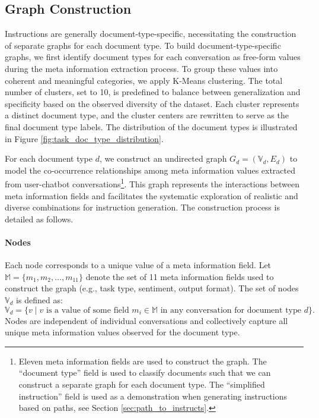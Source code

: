 \subsection{Graph Construction}
Instructions are generally document-type-specific, necessitating the construction of separate graphs for each document type. 
To build document-type-specific graphs, we first identify document types for each conversation as free-form values during the meta information extraction process. 
To group these values into coherent and meaningful categories, we apply K-Means clustering. The total number of clusters, set to 10, is predefined to balance between generalization and specificity based on the observed diversity of the dataset. Each cluster represents a distinct document type, and the cluster centers are rewritten to serve as the final document type labels. The distribution of the document types is illustrated in Figure \ref{fig:task_doc_type_distribution}. 

For each document type $d$, we construct an undirected graph $G_d = (\mathbb{V}_d, E_d)$ to model the co-occurrence relationships among meta information values extracted from user-chatbot conversations\footnote{Eleven meta information fields are used to construct the graph. The ``document type'' field is used to classify documents such that we can construct a separate graph for each document type. The ``simplified instruction'' field is used as a demonstration when generating instructions based on paths, see Section \ref{sec:path_to_instructs}.}. This graph represents the interactions between meta information fields and facilitates the systematic exploration of realistic and diverse combinations for instruction generation. The construction process is detailed as follows.

\paragraph{Nodes}
Each node corresponds to a unique value of a meta information field. Let $\mathbb{M} = \{m_1, m_2, \dots, m_{11}\}$ denote the set of 11 meta information fields used to construct the graph (e.g., task type, sentiment, output format). The set of nodes $\mathbb{V}_d$ is defined as:
\[
\mathbb{V}_d = \{v \mid v \text{ is a value of some field } m_i \in \mathbb{M}\text{ in any conversation for document type } d\}.
\]
Nodes are independent of individual conversations and collectively capture all unique meta information values observed for the document type.


